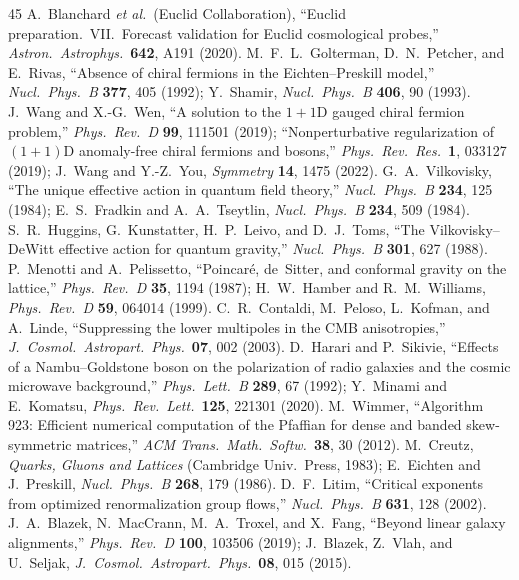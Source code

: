 \documentclass[11pt,a4paper]{article}
\begin{document}
\begin{thebibliography}{45}
 A.~Blanchard \textit{et al.}\ (Euclid Collaboration), ``Euclid preparation.\ VII.\ Forecast validation for Euclid cosmological probes,'' \textit{Astron.\ Astrophys.}\ \textbf{642}, A191 (2020).
 M.~F.~L.~Golterman, D.~N.~Petcher, and E.~Rivas, ``Absence of chiral fermions in the Eichten--Preskill model,'' \textit{Nucl.\ Phys.\ B} \textbf{377}, 405 (1992); Y.~Shamir, \textit{Nucl.\ Phys.\ B} \textbf{406}, 90 (1993).
 J.~Wang and X.-G.~Wen, ``A solution to the $1+1$D gauged chiral fermion problem,'' \textit{Phys.\ Rev.\ D} \textbf{99}, 111501 (2019); ``Nonperturbative regularization of $(1+1)$D anomaly-free chiral fermions and bosons,'' \textit{Phys.\ Rev.\ Res.}\ \textbf{1}, 033127 (2019); J.~Wang and Y.-Z.~You, \textit{Symmetry} \textbf{14}, 1475 (2022).
 G.~A.~Vilkovisky, ``The unique effective action in quantum field theory,'' \textit{Nucl.\ Phys.\ B} \textbf{234}, 125 (1984); E.~S.~Fradkin and A.~A.~Tseytlin, \textit{Nucl.\ Phys.\ B} \textbf{234}, 509 (1984).
 S.~R.~Huggins, G.~Kunstatter, H.~P.~Leivo, and D.~J.~Toms, ``The Vilkovisky--DeWitt effective action for quantum gravity,'' \textit{Nucl.\ Phys.\ B} \textbf{301}, 627 (1988).
 P.~Menotti and A.~Pelissetto, ``Poincar\'e, de~Sitter, and conformal gravity on the lattice,'' \textit{Phys.\ Rev.\ D} \textbf{35}, 1194 (1987); H.~W.~Hamber and R.~M.~Williams, \textit{Phys.\ Rev.\ D} \textbf{59}, 064014 (1999).
 C.~R.~Contaldi, M.~Peloso, L.~Kofman, and A.~Linde, ``Suppressing the lower multipoles in the CMB anisotropies,'' \textit{J.\ Cosmol.\ Astropart.\ Phys.}\ \textbf{07}, 002 (2003).
 D.~Harari and P.~Sikivie, ``Effects of a Nambu--Goldstone boson on the polarization of radio galaxies and the cosmic microwave background,'' \textit{Phys.\ Lett.\ B} \textbf{289}, 67 (1992); Y.~Minami and E.~Komatsu, \textit{Phys.\ Rev.\ Lett.}\ \textbf{125}, 221301 (2020).
 M.~Wimmer, ``Algorithm 923: Efficient numerical computation of the Pfaffian for dense and banded skew-symmetric matrices,'' \textit{ACM Trans.\ Math.\ Softw.}\ \textbf{38}, 30 (2012).
 M.~Creutz, \textit{Quarks, Gluons and Lattices} (Cambridge Univ.\ Press, 1983); E.~Eichten and J.~Preskill, \textit{Nucl.\ Phys.\ B} \textbf{268}, 179 (1986).
 D.~F.~Litim, ``Critical exponents from optimized renormalization group flows,'' \textit{Nucl.\ Phys.\ B} \textbf{631}, 128 (2002).
 J.~A.~Blazek, N.~MacCrann, M.~A.~Troxel, and X.~Fang, ``Beyond linear galaxy alignments,'' \textit{Phys.\ Rev.\ D} \textbf{100}, 103506 (2019); J.~Blazek, Z.~Vlah, and U.~Seljak, \textit{J.\ Cosmol.\ Astropart.\ Phys.}\ \textbf{08}, 015 (2015).

\end{thebibliography}
\end{document}
